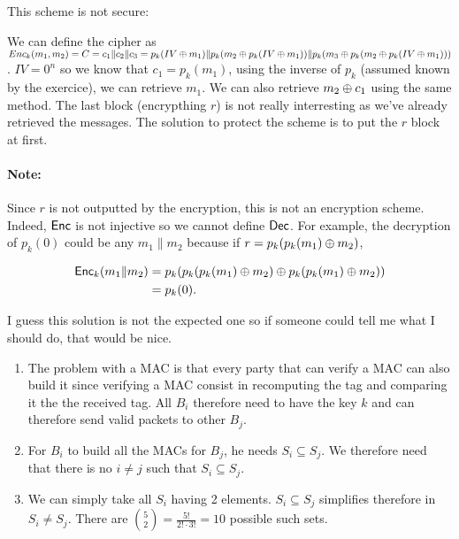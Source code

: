 \begin{solution}
  This scheme is not secure:

  We can define the cipher as $Enc_k(m_1, m_2) = C = c_1\| c_2 \| c_3 = p_k(IV\oplus m_1) \| p_k(m_2 \oplus p_k(IV\oplus m_1)) \| p_k(m_3 \oplus p_k(m_2 \oplus p_k(IV\oplus m_1)))$.
  $IV = 0^n$ so we know that $c_1 = p_k(m_1)$, using the inverse of $p_k$ (assumed known by the exercice), 
  we can retrieve $m_1$. We can also retrieve $m_2 \oplus c_1$ using the same method. 
  The last block (encrypthing $r$) is not really interresting as we've already retrieved 
  the messages. The solution to protect the scheme is to put the $r$ block at first.

\paragraph{Note: }
  Since $r$ is not outputted by the encryption, this is not an encryption scheme.
  Indeed, $\operatorname{\mathsf{Enc}}$ is not injective so we cannot define $\operatorname{\mathsf{Dec}}$.
  For example, the decryption of $p_k(0)$ could be any $m_1\|m_2$ because
  if $r = p_k(p_k(m_1) \oplus m_2)$,

  \begin{align*}
    \operatorname{\mathsf{Enc}}_k(m_1\|m_2) & = p_k(p_k(p_k(m_1) \oplus m_2) \oplus p_k(p_k(m_1) \oplus m_2))\\
                     & = p_k(0).
  \end{align*}

  I guess this solution is not the expected one so if someone could tell me what I should do, that would be nice.

\end{solution}

\begin{solution}
  \begin{enumerate}
    \item
      The problem with a MAC is that every party that can verify a MAC can also build it since verifying a MAC consist
      in recomputing the tag and comparing it the the received tag.
      All $B_i$ therefore need to have the key $k$ and can therefore send valid packets to other $B_j$.
    \item
      For $B_i$ to build all the MACs for $B_j$, he needs $S_i \subseteq S_j$.
      We therefore need that there is no $i \neq j$ such that $S_i \subseteq S_j$.
    \item We can simply take all $S_i$ having 2 elements.
      $S_i \subseteq S_j$ simplifies therefore in $S_i \neq S_j$.
      There are ${5 \choose 2} = \frac{5!}{2! \cdot 3!} = 10$ possible such sets.
  \end{enumerate}
\end{solution}
